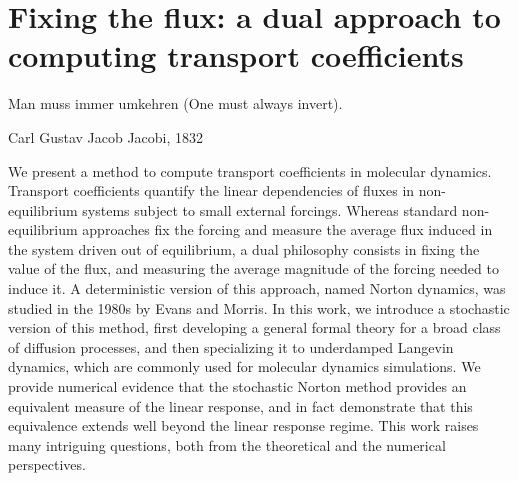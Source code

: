 \chapter{Fixing the flux: a dual approach to computing transport coefficients}
\label{04:chap:norton}
\epigraph{Man muss immer umkehren (One must always invert).}{Carl Gustav Jacob Jacobi, 1832}

\begin{chapterabstract}
We present a method to compute transport coefficients in molecular dynamics. Transport coefficients quantify the linear dependencies of fluxes in non-equilibrium systems subject to small external forcings. Whereas standard non-equilibrium approaches fix the forcing and measure the average flux induced in the system driven out of equilibrium, a dual philosophy consists in fixing the value of the flux, and measuring the average magnitude of the forcing needed to induce it. A deterministic version of this approach, named Norton dynamics, was studied in the 1980s by Evans and Morris. In this work, we introduce a stochastic version of this method, first developing a general formal theory for a broad class of diffusion processes, and then specializing it to underdamped Langevin dynamics, which are commonly used for molecular dynamics simulations.
We provide numerical evidence that the stochastic Norton method provides an equivalent measure of the linear response, and in fact demonstrate that this equivalence extends well beyond the linear response regime.
This work raises many intriguing questions, both from the theoretical and the numerical perspectives.
\end{chapterabstract}

